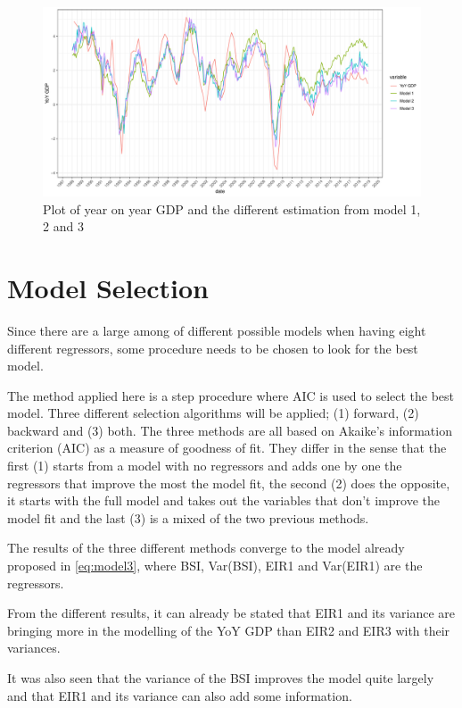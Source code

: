 \documentclass[12pt,a4paper,oneside]{book}
\begin{document}
\begin{figure}[!htbp]
    \centering
    \includegraphics[scale=0.5]{Graphs/predictions1.pdf}
    \caption{Plot of year on year GDP and the different estimation from model 1, 2 and 3}
    \label{fig:predictions1}
\end{figure}



\section{Model Selection}

Since there are a large among of different possible models when having eight different regressors, some procedure needs to be chosen to look for the best model.

The method applied here is a step procedure where AIC is used to select the best model.
Three different selection algorithms will be applied; (1) forward, (2) backward and  (3) both. 
The three methods are all based on Akaike's information criterion (AIC) as a measure of goodness of fit. They differ in the sense that the first (1) starts from a model with no regressors and adds one by one the regressors that improve the most the model fit, the second (2) does the opposite, it starts with the full model and takes out the variables that don't improve the model fit and the last (3) is a mixed of the two previous methods.

The results of the three different methods converge to the model already proposed in \autoref{eq:model3}, where BSI, Var(BSI), EIR1 and Var(EIR1) are the regressors.

From the different results, it can already be stated that EIR1 and its variance are bringing more in the modelling of the YoY GDP than EIR2 and EIR3 with their variances.

It was also seen that the variance of the BSI improves the model quite largely and that EIR1 and its variance can also add some information.
\end{document}

